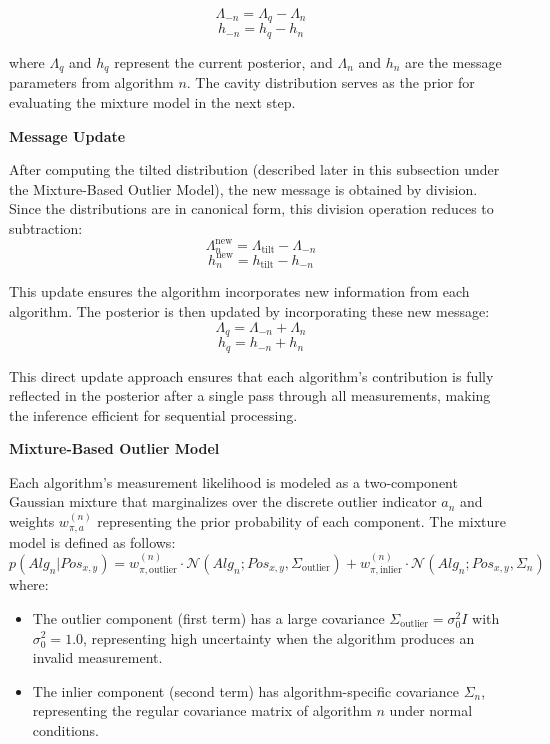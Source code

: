 \documentclass[12pt,a4paper]{article}
\begin{document}
\begin{equation}
\Lambda_{-n} = \Lambda_q - \Lambda_n
\end{equation}
\begin{equation}
h_{-n} = h_q - h_n
\end{equation}

where $\Lambda_q$ and $h_q$ represent the current posterior, and $\Lambda_n$ and $h_n$ are the message parameters from algorithm $n$. The cavity distribution serves as the prior for evaluating the mixture model in the next step.

\textbf{Message Update}

After computing the tilted distribution (described later in this subsection under the Mixture-Based Outlier Model), the new message is obtained by division. Since the distributions are in canonical form, this division operation reduces to subtraction:
\begin{equation}
\Lambda_n^{\text{new}} = \Lambda_{\text{tilt}} - \Lambda_{-n} 
\end{equation}
\begin{equation}
h_n^{\text{new}} = h_{\text{tilt}} - h_{-n}
\end{equation}

This update ensures the algorithm incorporates new information from each algorithm. The posterior is then updated by incorporating these new message:
\begin{equation}
\Lambda_q = \Lambda_{-n} + \Lambda_n 
\end{equation}
\begin{equation}
h_q = h_{-n} + h_n
\end{equation}

This direct update approach ensures that each algorithm's contribution is fully reflected in the posterior after a single pass through all measurements, making the inference efficient for sequential processing.

\textbf{Mixture-Based Outlier Model}

Each algorithm's measurement likelihood is modeled as a two-component Gaussian mixture that marginalizes over the discrete outlier indicator $a_n$ and weights $w_{\pi,a}^{(n)}$ representing the prior probability of each component. The mixture model is defined as follows:
\begin{equation}
p(Alg_n | Pos_{x,y}) = w_{\pi,\text{outlier}}^{(n)} \cdot \mathcal{N}(Alg_n; Pos_{x,y}, \Sigma_{\text{outlier}}) + w_{\pi,\text{inlier}}^{(n)} \cdot \mathcal{N}(Alg_n; Pos_{x,y}, \Sigma_n)
\end{equation}
where:
\begin{itemize}
    \item The outlier component (first term) has a large covariance $\Sigma_{\text{outlier}} = \sigma_0^2 I$ with $\sigma_0^2 = 1.0$, representing high uncertainty when the algorithm produces an invalid measurement.
    \item The inlier component (second term) has algorithm-specific covariance $\Sigma_n$, representing the regular covariance matrix of algorithm $n$ under normal conditions.
\end{itemize}
\end{document}
